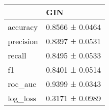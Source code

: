 \begin{tabular}{ll}
\toprule
 & GIN \\
\midrule
accuracy & 0.8566 ± 0.0464 \\
precision & 0.8397 ± 0.0531 \\
recall & 0.8495 ± 0.0533 \\
f1 & 0.8401 ± 0.0514 \\
roc_auc & 0.9399 ± 0.0343 \\
log_loss & 0.3171 ± 0.0989 \\
\bottomrule
\end{tabular}
